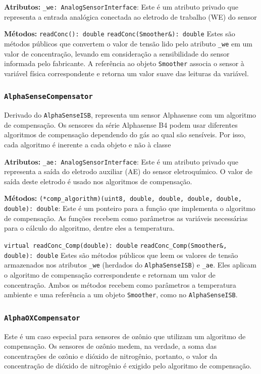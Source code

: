\textbf{Atributos:}
\texttt{\_we: AnalogSensorInterface}: Este é um atributo privado que representa a entrada analógica conectada ao eletrodo de trabalho (WE) do sensor

\textbf{Métodos:}
\texttt{readConc(): double}
\texttt{readConc(Smoother\&): double}
Estes são métodos públicos que convertem o valor de tensão lido pelo atributo \texttt{\_we} em um valor de concentração, levando em consideração a sensibilidade do sensor informada pelo fabricante. A referência ao objeto \texttt{Smoother} associa o sensor à variável física correspondente e retorna um valor suave das leituras da variável.

\subsubsection{\texttt{AlphaSenseCompensator}}
Derivado do \texttt{AlphaSenseISB}, representa um sensor Alphasense com um algoritmo de compensação. Os sensores da série Alphasense B4 podem usar diferentes algoritmos de compensação dependendo do gás ao qual são sensíveis. Por isso, cada algoritmo é inerente a cada objeto e não à classe

\textbf{Atributos:}
\texttt{\_ae: AnalogSensorInterface}: Este é um atributo privado que representa a saída do eletrodo auxiliar (AE) do sensor eletroquímico. O valor de saída deste eletrodo é usado nos algoritmos de compensação.

\textbf{Métodos:}
\texttt{(*comp\_algorithm)(uint8, double, double, double, double, double): double}: Este é um ponteiro para a função que implementa o algoritmo de compensação. As funções recebem como parâmetros as variáveis necessárias para o cálculo do algoritmo, dentre eles a temperatura.

\texttt{{virtual} readConc\_Comp(double): double}
\texttt{readConc\_Comp(Smoother\&, double): double}
Estes são métodos públicos que leem os valores de tensão armazenados nos atributos \texttt{\_we} (herdados do \texttt{AlphaSenseISB}) e \texttt{\_ae}. Eles aplicam o algoritmo de compensação correspondente e retornam um valor de concentração. Ambos os métodos recebem como parâmetros a temperatura ambiente e uma referência a um objeto \texttt{Smoother}, como no \texttt{AlphaSenseISB}.

\subsubsection{\texttt{AlphaOXCompensator}}
Este é um caso especial para sensores de ozônio que utilizam um algoritmo de compensação. Os sensores de ozônio medem, na verdade, a soma das concentrações de ozônio e dióxido de nitrogênio, portanto, o valor da concentração de dióxido de nitrogênio é exigido pelo algoritmo de compensação.

